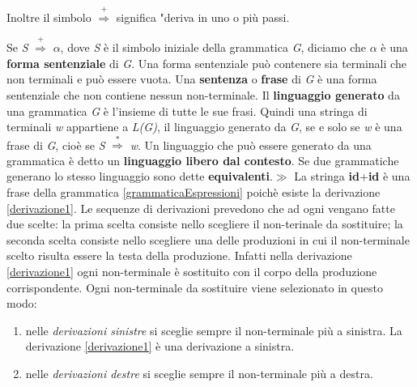 Inoltre il simbolo $\overset{+}{\Rightarrow}$ significa "deriva in uno o più passi. \par
Se \textit{S} $\overset{+}{\Rightarrow}$ $\alpha$, dove \textit{S} è il simbolo iniziale della grammatica \textit{G}, diciamo che $\alpha$ è una \textbf{forma sentenziale}  di \textit{G}. Una forma sentenziale può contenere sia terminali che non terminali e può essere vuota. Una \textbf{sentenza} o \textbf{frase} di \textit{G} è una forma sentenziale che non contiene nessun non-terminale. Il \textbf{linguaggio generato} da una grammatica \textit{G} è l'insieme di tutte le sue frasi. Quindi una stringa di terminali \textit{w} appartiene a \textit{L(G)}, il linguaggio generato da \textit{G}, se e solo se \textit{w} è una frase di \textit{G}, cioè se \textit{S} $\overset{*}{\Rightarrow}$ \textit{w}. Un linguaggio che può essere generato da una grammatica è detto un \textbf{linguaggio libero dal contesto}. Se due grammatiche generano lo stesso linguaggio sono dette \textbf{equivalenti}.$\gg$ La stringa \textbf{id}+\textbf{id} è una frase della grammatica \ref{grammaticaEspressioni} poichè esiste la derivazione \ref{derivazione1}. Le sequenze di derivazioni prevedono che ad ogni vengano fatte due scelte: la prima scelta consiste nello scegliere il non-terinale da sostituire; la seconda scelta consiste nello scegliere una delle produzioni in cui il non-terminale scelto risulta essere la testa della produzione. Infatti nella derivazione \ref{derivazione1} ogni non-terminale è sostituito con il corpo della produzione corrispondente. Ogni non-terminale da sostituire viene selezionato in questo modo:
\begin{enumerate}
	\item nelle \textit{derivazioni sinistre} si sceglie sempre il non-terminale più a sinistra. La derivazione \ref{derivazione1} è una derivazione a sinistra.
	\item  nelle \textit{derivazioni destre} si sceglie sempre il non-terminale più a destra. 
\end{enumerate}
